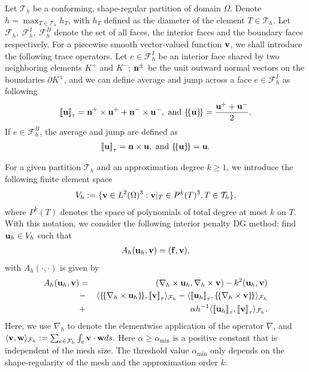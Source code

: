 \documentclass[final,leqno]{siamltex704}
\newcommand{\bn}{{\bf n}}
\newcommand{\bv}{{\bf v}}
\def\bbf{{\bf f}}
\def\bn{{\bf n}}
\def\bu{{\bf u}}
\def\bv{{\bf v}}
\def\bw{{\bf w}}
\def\ljump{{[\![}}
\def\rjump{{]\!]}}
\def\lavg{{\{\!\{}}
\def\ravg{{\}\!\}}}
\begin{document}
\vspace{5pt}
Let $\mathcal{T}_h$ be a conforming, shape-regular partition of domain $\Omega$. Denote $h=\max_{T\in\mathcal{T}_h}h_T$, with $h_T$ defined as the diameter of the element $T\in\mathcal{T}_h$. Let $\mathcal{F}_h,\ \mathcal{F}_h^I,\ \mathcal{F}_h^B$ denote the set of all faces, the interior faces and the boundary faces respectively. 
For a piecewise smooth vector-valued function $\bv$, we shall introduce the following trace operators. Let $e\in\mathcal{F}_h^I$ be an interior face shared by two neighboring elements $K^+$ and $K^-$; $\bn^\pm$ be the unit outward normal vectors on the boundaries $\partial K^\pm$, and we can define average and jump across a face $e\in\mathcal{F}_h^I$ as following
\begin{eqnarray*}
\ljump \bu \rjump_{\tau}={\bf n}^+\times\bu^++{\bf n}^-\times\bu^-,\mbox{ and }\lavg \bu\ravg=\frac{\bu^++\bu^-}{2}.
\end{eqnarray*}
If $e\in\mathcal{F}_h^B$, the average and jump are defined as
\begin{eqnarray*}
\ljump \bu \rjump_{\tau}={\bf n}\times\bu,\mbox{ and } \lavg\bu\ravg=\bu.
\end{eqnarray*}


For a given partition $\mathcal{T}_h$ and an approximation degree $k\ge 1$, we introduce the following finite element space
\begin{eqnarray}
V_h:=\{\bv\in L^2(\Omega)^3:\bv|_T\in P^k(T)^3,T\in\mathcal{T}_h\},
\end{eqnarray}
where $P^k(T)$ denotes the space of polynomials of total degree at most $k$ on $T$. With this notation, we consider the following interior penalty DG method: find $\bu_h\in V_h$ such that
\begin{eqnarray}
A_h(\bu_h,\bv)=(\bbf,\bv),
\end{eqnarray}
with $A_h(\cdot,\cdot)$ is given by
\begin{eqnarray}
A_h(\bu_h,\bv)&=&(\nabla_h\times \bu_h,\nabla_h\times \bv)-k^2(\bu_h,\bv)\notag\\
&-&\langle\lavg\nabla_h\times \bu_h\ravg,\ljump \bv\rjump_{\tau}\rangle_{\mathcal{F}_h}-\langle\ljump \bu_h\rjump_{\tau},\lavg\nabla_h\times \bv\ravg\rangle_{\mathcal{F}_h}\\
&+&\alpha h^{-1}\langle\ljump \bu_h\rjump_{\tau},\ljump \bv\rjump_{\tau}\rangle_{\mathcal{F}_h}.%
\end{eqnarray}
Here, we use $\nabla_h$ to denote the elementwise application of the operator $\nabla$, and $\langle \bv, \bw\rangle_{\mathcal{F}_h}:=\sum_{e\in\mathcal{F}_h}\int_e \bv\cdot\bw ds.$
Here $\alpha\ge \alpha_{\min}$ is a positive constant that is independent of the mesh size. The threshold value $\alpha_{\min}$ only depends on the shape-regularity of the mesh and the approximation order $k$.
\end{document}

